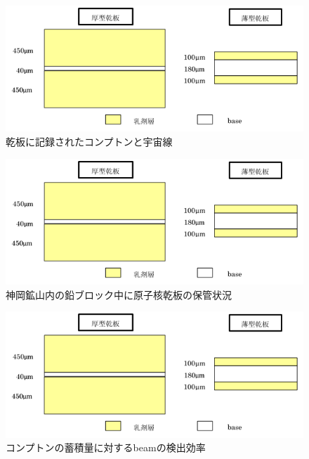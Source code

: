 \documentclass[12pt,a4paper]{jarticle}
\begin{document}
\par
\begin{figure}[htbp]
    \begin{center}
     \includegraphics[width=140mm]{emulsionorder.png}
    \end{center}
    \caption{乾板に記録されたコンプトンと宇宙線\label{fig:compton_and_cosmicray_in_emulsion}}
\end{figure}
\begin{figure}[htbp]
    \begin{center}
     \includegraphics[width=140mm]{emulsionorder.png}
    \end{center}
    \caption{神岡鉱山内の鉛ブロック中に原子核乾板の保管状況\label{fig:emulsion_in_Kamioka}}
\end{figure}
\begin{figure}[htbp]
    \begin{center}
     \includegraphics[width=140mm]{emulsionorder.png}
    \end{center}
    \caption{コンプトンの蓄積量に対するbeamの検出効率\label{fig:beam_efficiency_to_compton}}
\end{figure}
\end{document}
